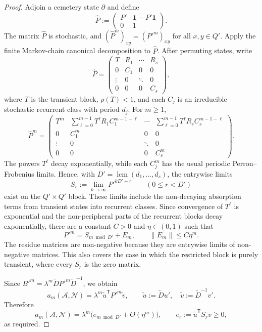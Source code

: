 \begin{proof}
  Adjoin a cemetery state \(\partial\) and define
  \[
    \widehat P:=
    \begin{pmatrix}
      P' & \mathbf{1}-P'\mathbf{1}\\
      0 & 1
    \end{pmatrix}.
  \]
  The matrix \(\widehat P\) is stochastic, and
  \((\widehat P^m)_{xy}=(P'^m)_{xy}\) for all \(x,y\in Q'\). Apply the
  finite Markov-chain canonical decomposition to \(\widehat P\). After
  permuting states, write
  \[
    \widehat P=
    \begin{pmatrix}
      T & R_1 & \cdots & R_s\\
      0 & C_1 & 0 & 0\\
      \vdots & 0 & \ddots & 0\\
      0 & 0 & 0 & C_s
    \end{pmatrix},
  \]
  where \(T\) is the transient block, \(\rho(T)<1\), and each \(C_j\) is
  an irreducible stochastic recurrent class with period \(d_j\). For
  \(m\ge1\),
  \[
    \widehat P^m=
    \begin{pmatrix}
      T^m &
      \sum_{\ell=0}^{m-1}T^\ell R_1C_1^{m-1-\ell} &
      \cdots &
      \sum_{\ell=0}^{m-1}T^\ell R_sC_s^{m-1-\ell}\\
      0 & C_1^m & 0 & 0\\
      \vdots & 0 & \ddots & 0\\
      0 & 0 & 0 & C_s^m
    \end{pmatrix}.
  \]
  The powers \(T^\ell\) decay exponentially, while each \(C_j^m\) has
  the usual periodic Perron--Frobenius limits. Hence, with
  \(D'=\operatorname{lcm}(d_1,\dots,d_s)\), the entrywise limits
  \[
    S_r:=\lim_{k\to\infty}P'^{kD'+r}
    \qquad(0\le r<D')
  \]
  exist on the \(Q'\times Q'\) block. These limits include the
  non-decaying absorption terms from transient states into recurrent
  classes. Since convergence of \(T^\ell\) is exponential and the
  non-peripheral parts of the recurrent blocks decay exponentially,
  there are a constant \(C>0\) and \(\eta\in(0,1)\) such that
  \[
    P'^m=S_{m\bmod D'}+E_m,
    \qquad
    \|E_m\|\le C\eta^m.
  \]
  The residue matrices are non-negative because they are entrywise
  limits of non-negative matrices. This also covers the case in which
  the restricted block is purely transient, where every \(S_r\) is the
  zero matrix.

  Since \(B'^m=\lambda^m\widetilde DP'^m\widetilde D^{-1}\), we obtain
  \[
    a_m(\mathcal A,\mathcal N)
    =\lambda^m\widetilde u^{\mathsf T}P'^m\widetilde v,
    \qquad
    \widetilde u:=\widetilde D u',
    \quad
    \widetilde v:=\widetilde D^{-1}v'.
  \]
  Therefore
  \[
    a_m(\mathcal A,\mathcal N)
    =\lambda^m\bigl(e_{m\bmod D'}+O(\eta^m)\bigr),
    \qquad
    e_r:=\widetilde u^{\mathsf T}S_r\widetilde v\ge 0,
  \]
  as required.
\end{proof}

